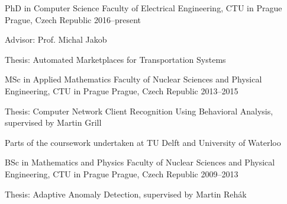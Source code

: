 

\begin{cventries}

  \cventry
    {PhD in Computer Science} %
    {Faculty of Electrical Engineering, CTU in Prague} %
    {Prague, Czech Republic} %
    {2016--present} %
    {
      \begin{cvitems} %
        \item {Advisor: Prof. Michal Jakob}
        \item {Thesis: Automated Marketplaces for Transportation Systems}
      \end{cvitems}
    }


  \cventry
    {MSc in Applied Mathematics} %
    {Faculty of Nuclear Sciences and Physical Engineering, CTU in Prague} %
    {Prague, Czech Republic} %
    {2013--2015} %
    {
      \begin{cvitems} %
        \item {Thesis: Computer Network Client Recognition Using Behavioral Analysis, supervised by Martin Grill}
        \item {Parts of the coursework undertaken at TU Delft and University of Waterloo}
      \end{cvitems}
    }

  \cventry
    {BSc in Mathematics and Physics} %
    {Faculty of Nuclear Sciences and Physical Engineering, CTU in Prague} %
    {Prague, Czech Republic} %
    {2009--2013} %
    {
      \begin{cvitems} %
        \item {Thesis: Adaptive Anomaly Detection, supervised by Martin Rehák }
      \end{cvitems}
    }

\end{cventries}
